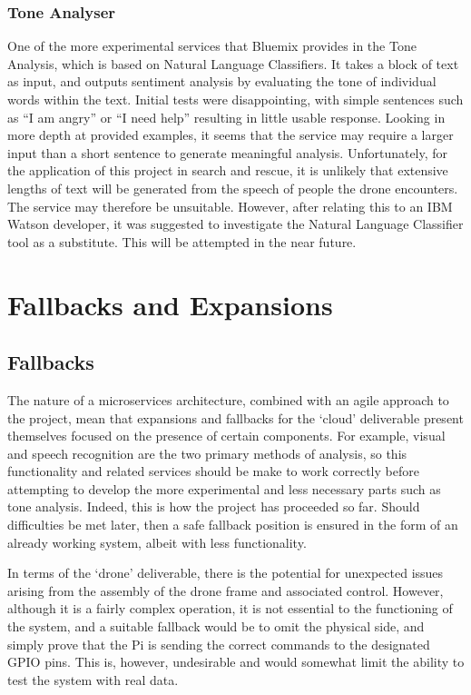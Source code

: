 \documentclass{article}
\begin{document}
\subsubsection{Tone Analyser}
One of the more experimental services that Bluemix provides in the Tone Analysis, which is based on Natural Language Classifiers. It takes a block of text as input, and outputs sentiment analysis by evaluating the tone of individual words within the text. Initial tests were disappointing, with simple sentences such as ``I am angry'' or ``I need help'' resulting in little usable response. Looking in more depth at provided examples, it seems that the service may require a larger input than a short sentence to generate meaningful analysis. Unfortunately, for the application of this project in search and rescue, it is unlikely that extensive lengths of text will be generated from the speech of people the drone encounters. The service may therefore be unsuitable. However, after relating this to an IBM Watson developer, it was suggested to investigate the Natural Language Classifier tool as a substitute. This will be attempted in the near future.

\section{Fallbacks and Expansions}
\subsection{Fallbacks}
The nature of a microservices architecture, combined with an agile approach to the project, mean that expansions and fallbacks for the `cloud' deliverable present themselves focused on the presence of certain components. For example, visual and speech recognition are the two primary methods of analysis, so this functionality and related services should be make to work correctly before attempting to develop the more experimental and less necessary parts such as tone analysis. Indeed, this is how the project has proceeded so far. Should difficulties be met later, then a safe fallback position is ensured in the form of an already working system, albeit with less functionality.

\vspace{\baselineskip} \noindent
In terms of the `drone' deliverable, there is the potential for unexpected issues arising from the assembly of the drone frame and associated control. However, although it is a fairly complex operation, it is not essential to the functioning of the system, and a suitable fallback would be to omit the physical side, and simply prove that the Pi is sending the correct commands to the designated GPIO pins. This is, however, undesirable and would somewhat limit the ability to test the system with real data.
\end{document}
